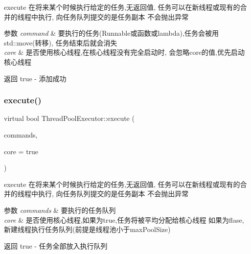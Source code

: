 execute 在将来某个时候执行给定的任务,无返回值, 任务可以在新线程或现有的合并的线程中执行, 向任务队列提交的是任务副本 不会抛出异常 


\begin{DoxyParams}{参数}
{\em command} & 要执行的任务(Runnable或函数或lambda),任务会被用std\+::move(转移), 任务结束后就会消失\\
\hline
{\em core} & 是否使用核心线程,在核心线程没有完全启动时, 会忽略core的值,优先启动核心线程\\
\hline
\end{DoxyParams}
\begin{DoxyReturn}{返回}
true -\/ 添加成功 
\end{DoxyReturn}
\mbox{\label{classThreadPoolExecutor_a451bba3f90dbed2ba7e491ebc391b3c6}} 
\subsubsection{\texorpdfstring{execute()}{execute()}\hspace{0.1cm}{\footnotesize\ttfamily [3/3]}}
{\footnotesize\ttfamily virtual bool Thread\+Pool\+Executor\+::execute (\begin{DoxyParamCaption}\item[{\hyperlink{classBlockingQueue}{Blocking\+Queue}$<$ \hyperlink{classRunnable_abe8d3066c7305401d6f0aad8e70780f2}{Runnable\+::sptr} $>$ \&}]{commands,  }\item[{bool}]{core = {\ttfamily true} }\end{DoxyParamCaption})\hspace{0.3cm}{\ttfamily [virtual]}}



execute 在将来某个时候执行给定的任务,无返回值, 任务可以在新线程或现有的合并的线程中执行, 向任务队列提交的是任务副本 不会抛出异常 


\begin{DoxyParams}{参数}
{\em commands} & 要执行的任务队列 \\
\hline
{\em core} & 是否使用核心线程,如果为true,任务将被平均分配给核心线程 如果为flase,新建线程执行任务队列(前提是线程池小于max\+Pool\+Size)\\
\hline
\end{DoxyParams}
\begin{DoxyReturn}{返回}
true -\/ 任务全部放入执行队列 
\end{DoxyReturn}
\mbox{\label{classThreadPoolExecutor_ac9345329aa167200bec31951d2f5a690}} 
